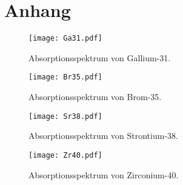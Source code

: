 \newpage

\section*{Anhang}
\label{sec:Anhang}

\begin{figure}
    \centering
    \texttt{[image: Ga31.pdf]}
    \caption{Absorptionsspektrum von Gallium-31.}
    \label{fig:Ga31}
  \end{figure}
  
  \begin{figure}
    \centering
    \texttt{[image: Br35.pdf]}
    \caption{Absorptionsspektrum von Brom-35.}
    \label{fig:Br35}
  \end{figure}
  
  \begin{figure}
    \centering
    \texttt{[image: Sr38.pdf]}
    \caption{Absorptionsspektrum von Strontium-38.}
    \label{fig:Sr38}
  \end{figure}
  
  \begin{figure}
    \centering
    \texttt{[image: Zr40.pdf]}
    \caption{Absorptionsspektrum von Zirconium-40.}
    \label{fig:Zr40}
  \end{figure}
